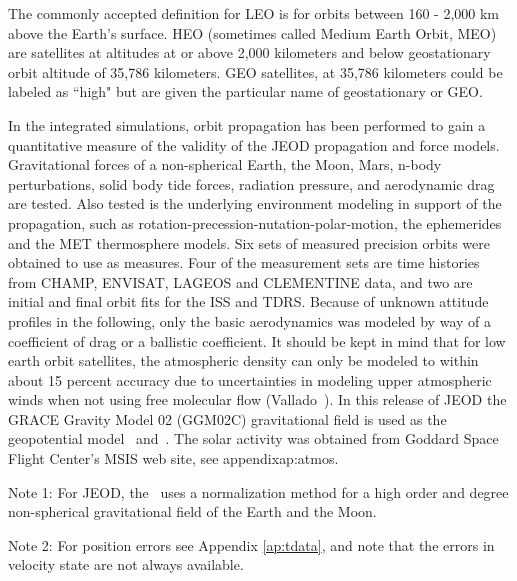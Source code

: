 The commonly accepted definition for LEO is for orbits between 160 - 2,000 km above
the Earth's surface. HEO (sometimes called Medium Earth Orbit, MEO) are satellites at
altitudes at or above 2,000 kilometers and below geostationary orbit altitude of 35,786
kilometers.  GEO satellites, at 35,786 kilometers could be labeled as ``high" but are
given the particular name of geostationary or GEO.

In the integrated simulations, orbit propagation has been performed to gain a quantitative
measure of the validity of the JEOD propagation and force models.  Gravitational forces
of a non-spherical Earth, the Moon, Mars, n-body perturbations, solid body tide forces,
radiation pressure, and aerodynamic drag are tested.  Also tested is the underlying
environment modeling in support of the propagation, such as rotation-precession-nutation-polar-motion,
the ephemerides and the MET thermosphere models.  Six sets of measured precision orbits
were obtained to use as measures. Four of the measurement sets are time histories from
CHAMP, ENVISAT, LAGEOS and CLEMENTINE data, and two are initial and final orbit fits for
the ISS and TDRS.  Because of unknown attitude profiles in the following, only the basic
aerodynamics was modeled by way of a coefficient of drag or a ballistic coefficient.  It
should be kept in mind that for low earth orbit satellites, the atmospheric density can
only be modeled to within about 15 percent accuracy due to uncertainties in modeling upper
atmospheric winds when not using free molecular flow (Vallado~\cite{VMcC}).  In this release
of JEOD the GRACE Gravity Model 02 (GGM02C) gravitational field is used as the geopotential
model~\cite{2005JGeod} and~\cite{grace}. The solar activity was obtained from Goddard Space
Flight Center's MSIS web site, see appendix{ap:atmos}.


Note 1: For JEOD, the \ uses a normalization method for a high order and
degree non-spherical gravitational field of the Earth and the Moon.

Note 2: For position errors see Appendix \ref{ap:tdata}, and note that the errors in velocity
state are not always available.

\clearpage

